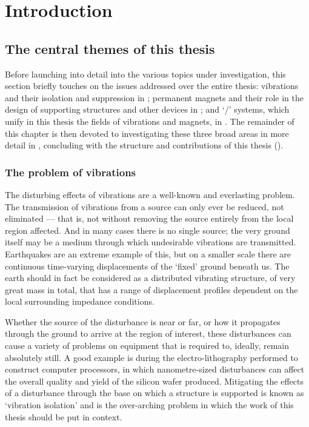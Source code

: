 \documentclass[11pt,a4paper]{memoir}
\begin{document}
\chapter{Introduction}

\section{The central themes of this thesis}

Before launching into detail into the various topics under investigation, this section briefly touches on the issues addressed over the entire thesis: vibrations and their isolation and suppression in ; permanent magnets and their role in the design of supporting structures and other devices in ; and `\qzs/' systems, which unify in this thesis the fields of vibrations and magnets, in .
The remainder of this chapter is then devoted to investigating these three broad areas in more detail in , concluding with the structure and contributions of this thesis ().


\subsection{The problem of vibrations}

The disturbing effects of vibrations are a well-known and everlasting problem.
The transmission of vibrations from a source can only ever be reduced, not eliminated — that is, not without removing the source entirely from the local region affected.
And in many cases there is no single source; the very ground itself may be a medium through which undesirable vibrations are transmitted.
Earthquakes are an extreme example of this, but on a smaller scale there are continuous time-varying displacements of the `fixed' ground beneath us.
The earth should in fact be considered as a distributed vibrating structure, of very great mass in total, that has a range of displacement profiles dependent on the local surrounding impedance conditions.

Whether the source of the disturbance is near or far, or how it propagates through the ground to arrive at the region of interest, these disturbances can cause a variety of problems on equipment that is required to, ideally, remain absolutely still.
A good example is during the electro-lithography performed to construct computer processors, in which nanometre-sized disturbances can affect the overall quality and yield of the silicon wafer produced.
Mitigating the effects of a disturbance through the base on which a structure is supported is known as `vibration isolation' and is the over-arching problem in which the work of this thesis should be put in context.
\end{document}

